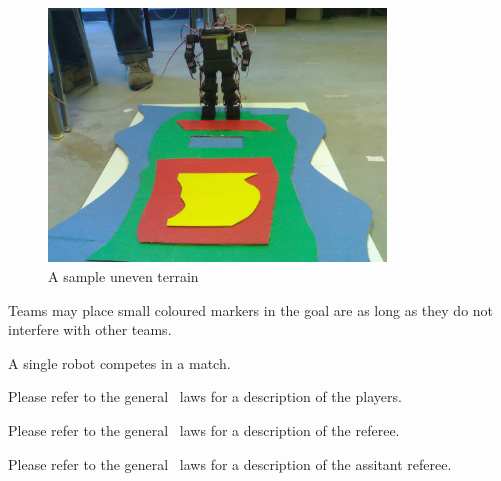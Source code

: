 \documentclass[12pt]{hurocup}
\begin{document}
\begin{lawlist}[LC]
  \begin{figure}
    \begin{center}
      \includegraphics[width=0.8\textwidth]{Figures/uneven-terrain}
    \end{center}
    \caption{A sample uneven terrain}
    \label{fig:uneven-terrain}
  \end{figure}

\item Teams may place small coloured markers in the goal are as long
  as they do not interfere with other teams.

\end{lawlist}


\begin{lawlist}[LC]
\item A single robot competes in a match.
\end{lawlist}


Please refer to the general \HuroCup\ laws for a description of
the players.


Please refer to the general \HuroCup\ laws for a description of
the referee.


Please refer to the general \HuroCup\ laws for a description of
the assitant referee.

\end{document}

